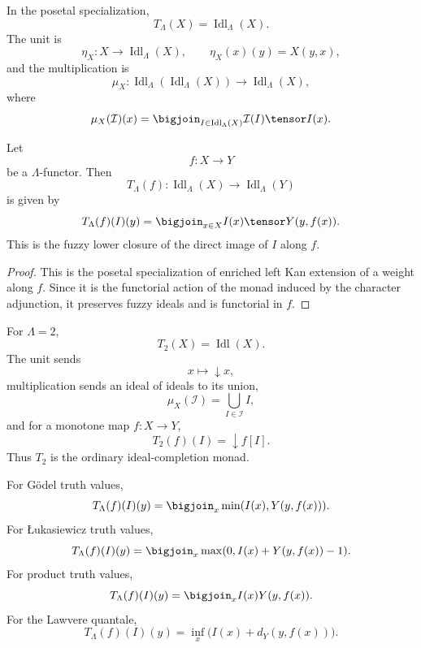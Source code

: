 \begin{definition}
\label{def:fuzzy-ideal-monad-posetal}
In the posetal specialization,
\[
    T_\Lambda(X)=\operatorname{Idl}_\Lambda(X).
\]
The unit is
\[
    \eta_X:X\to\operatorname{Idl}_\Lambda(X),
    \qquad
    \eta_X(x)(y)=X(y,x),
\]
and the multiplication is
\[
    \mu_X:
    \operatorname{Idl}_\Lambda(\operatorname{Idl}_\Lambda(X))
    \to
    \operatorname{Idl}_\Lambda(X),
\]
where
\[
    \mu_X(\mathcal I)(x)
    =
    \bigjoin_{I\in\operatorname{Idl}_\Lambda(X)}
    \mathcal I(I)\tensor I(x).
\]
\end{definition}

\begin{proposition}
\label{prop:fuzzy-ideal-monad-functorial-action}
Let
\[
    f:X\to Y
\]
be a \(\Lambda\)-functor.  Then
\[
    T_\Lambda(f):
    \operatorname{Idl}_\Lambda(X)\to\operatorname{Idl}_\Lambda(Y)
\]
is given by
\[
    T_\Lambda(f)(I)(y)
    =
    \bigjoin_{x\in X}I(x)\tensor Y(y,f(x)).
\]
This is the fuzzy lower closure of the direct image of \(I\) along \(f\).
\end{proposition}

\begin{proof}
This is the posetal specialization of enriched left Kan extension of a weight
along \(f\).  Since it is the functorial action of the monad induced by the
character adjunction, it preserves fuzzy ideals and is functorial in \(f\).
\end{proof}

\begin{example}
\label{ex:crisp-ideal-monad}
For \(\Lambda=2\),
\[
    T_2(X)=\operatorname{Idl}(X).
\]
The unit sends
\[
    x\longmapsto\downarrow x,
\]
multiplication sends an ideal of ideals to its union,
\[
    \mu_X(\mathcal I)=\bigcup_{I\in\mathcal I}I,
\]
and for a monotone map \(f:X\to Y\),
\[
    T_2(f)(I)=\downarrow f[I].
\]
Thus \(T_2\) is the ordinary ideal-completion monad.
\end{example}

\begin{example}
\label{ex:standard-ideal-direct-image}
For G\"odel truth values,
\[
    T_\Lambda(f)(I)(y)
    =
    \bigjoin_x \min(I(x),Y(y,f(x))).
\]
For {\L}ukasiewicz truth values,
\[
    T_\Lambda(f)(I)(y)
    =
    \bigjoin_x \max(0,I(x)+Y(y,f(x))-1).
\]
For product truth values,
\[
    T_\Lambda(f)(I)(y)
    =
    \bigjoin_x I(x)Y(y,f(x)).
\]
For the Lawvere quantale,
\[
    T_\Lambda(f)(I)(y)
    =
    \inf_x\bigl(I(x)+d_Y(y,f(x))\bigr).
\]
\end{example}

